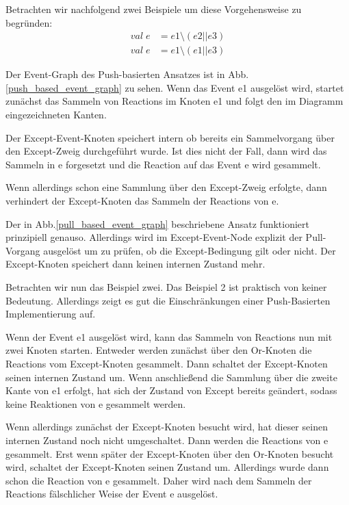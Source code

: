 Betrachten wir nachfolgend zwei Beispiele um diese Vorgehensweise zu begründen:
\begin{eqnarray}
val \; e & = e1 \setminus (e2 || e3)\\
val \; e & = e1 \setminus (e1 || e3)
\end{eqnarray}

Der Event-Graph des Push-basierten Ansatzes ist in
Abb.\ref{push_based_event_graph} zu sehen. Wenn das Event e1 ausgelöst wird,
startet zunächst das Sammeln von Reactions im Knoten e1 und folgt den im
Diagramm eingezeichneten Kanten. 

Der Except-Event-Knoten speichert intern ob bereits ein Sammelvorgang über den
Except-Zweig durchgeführt wurde. Ist dies nicht der Fall, dann wird das Sammeln
in e forgesetzt und die Reaction auf das Event e wird gesammelt. 

Wenn allerdings schon eine Sammlung über den Except-Zweig erfolgte, dann
verhindert der Except-Knoten das Sammeln der Reactions von e.

Der in Abb.\ref{pull_based_event_graph} beschriebene Ansatz funktioniert
prinzipiell genauso. Allerdings wird im Except-Event-Node explizit der Pull-Vorgang ausgelöst um zu
prüfen, ob die Except-Bedingung gilt oder nicht. Der Except-Knoten speichert
dann keinen internen Zustand mehr.

Betrachten wir nun das Beispiel zwei. Das Beispiel 2 ist praktisch von keiner
Bedeutung. Allerdings zeigt es gut die Einschränkungen einer Push-Basierten
Implementierung auf. 

Wenn der Event e1 ausgelöst wird, kann das Sammeln von Reactions nun mit zwei
Knoten starten. Entweder werden zunächst über den Or-Knoten die Reactions vom
Except-Knoten gesammelt. Dann schaltet der Except-Knoten seinen internen Zustand
um. Wenn anschließend die Sammlung über die zweite Kante von e1 erfolgt, hat
sich der Zustand von Except bereits geändert, sodass keine Reaktionen von e
gesammelt werden.

Wenn allerdings zunächst der Except-Knoten besucht wird, hat dieser seinen
internen Zustand noch nicht umgeschaltet. Dann werden die Reactions von e
gesammelt. Erst wenn später der Except-Knoten über den Or-Knoten besucht wird,
schaltet der Except-Knoten seinen Zustand um. Allerdings wurde dann schon die
Reaction von e gesammelt. Daher wird nach dem Sammeln der Reactions
fälschlicher Weise der Event e ausgelöst.


 



